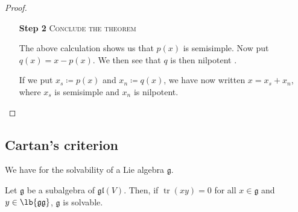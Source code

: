 \documentclass{article}
\DeclarePairedDelimiter\lb\lbrack\rbrack
\DeclareMathOperator{\tr}{tr}
\newcommand*\frkg{{\ensuremath{\mathfrak{g}}}}
\newcommand*\gl{\ensuremath{\mathfrak{gl}}}
\begin{document}
\begin{proof}
\begin{itemize}
        \item[\textbf{Step 2}] 
            \textsc{\color{Crimson} Conclude the theorem}

            The above calculation shows us that $p(x)$ is semisimple.
            Now put $q(x) = x - p(x)$.
            We then see that $q$ is then nilpotent .

            If we put $x_s \coloneq p(x)$ and $x_n \coloneq q(x)$, we have now written $x = x_s + x_n$, where $x_s$ is semisimple and $x_n$ is nilpotent.


    \end{itemize}

\end{proof}

\subsection{Cartan's criterion}

We have  for the solvability of a Lie algebra $\frkg$.

\begin{theorem}
    \label{thm:Cartan'sCriterion}
    Let $\frkg$ be a subalgebra of $\gl(V)$.
    Then, if $\tr(xy) = 0$ for all $x \in \frkg$ and $y \in \lb{\frkg\frkg}$, $\frkg$ is solvable.
\end{theorem}
\end{document}
